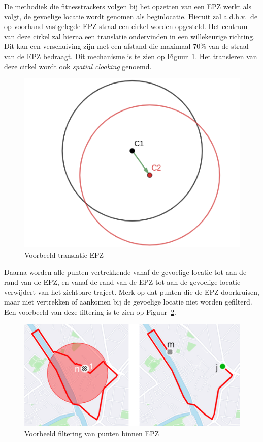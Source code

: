 De methodiek die fitnesstrackers volgen bij het opzetten van een \ac{EPZ} werkt
als volgt, de gevoelige locatie wordt genomen als beginlocatie. Hieruit zal
a.d.h.v.\ de op voorhand vastgelegde \ac{EPZ}-straal een cirkel worden
opgesteld. Het centrum van deze cirkel zal hierna een translatie ondervinden in
een willekeurige richting. Dit kan een verschuiving zijn met een afstand die
maximaal 70\% van de straal van de \ac{EPZ} bedraagt. Dit mechanisme is te zien
op Figuur~\ref{fig:translation}. Het transleren van deze cirkel wordt ook
\textit{spatial cloaking} genoemd.
\begin{figure}[h]
    \centering
    \includegraphics[width=0.4\linewidth]{fig/EPZ-mechanisme/Translation_Center.png}
    \caption{Voorbeeld translatie EPZ}\label{fig:translation}
\end{figure}

Daarna worden alle punten vertrekkende vanaf de gevoelige locatie tot aan de
rand van de \ac{EPZ}, en vanaf de rand van de \ac{EPZ} tot aan de gevoelige
locatie verwijdert van het zichtbare traject. Merk op dat punten die de
\ac{EPZ} doorkruisen, maar niet vertrekken of aankomen bij de gevoelige locatie
niet worden gefilterd. Een voorbeeld van deze filtering is te zien op
Figuur~\ref{fig:drop points}.
\begin{figure}[h]
    \centering
    \includegraphics[width=0.7\linewidth]{fig/EPZ-mechanisme/DropEPZPoints.png}
    \caption{Voorbeeld filtering van punten binnen \ac{EPZ}}\label{fig:drop points}
\end{figure}

